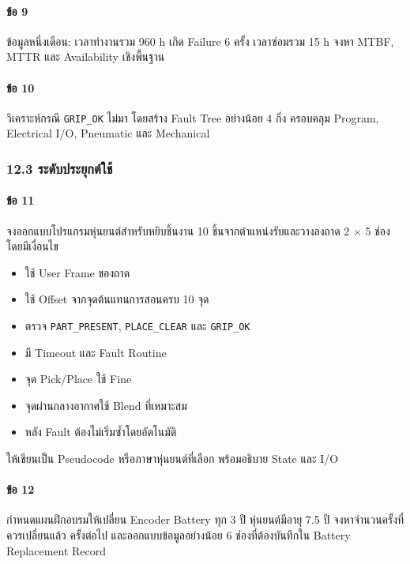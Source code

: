 \paragraph{ข้อ 9}

ข้อมูลหนึ่งเดือน: เวลาทำงานรวม 960 h เกิด Failure 6 ครั้ง เวลาซ่อมรวม 15 h จงหา MTBF, MTTR และ Availability เชิงพื้นฐาน

\paragraph{ข้อ 10}

วิเคราะห์กรณี \texttt{GRIP\_OK} ไม่มา โดยสร้าง Fault Tree อย่างน้อย 4 กิ่ง ครอบคลุม Program, Electrical I/O, Pneumatic และ Mechanical

\subsubsection{12.3 ระดับประยุกต์ใช้}

\paragraph{ข้อ 11}

จงออกแบบโปรแกรมหุ่นยนต์สำหรับหยิบชิ้นงาน 10 ชิ้นจากตำแหน่งรับและวางลงถาด 2 × 5 ช่อง โดยมีเงื่อนไข

\begin{itemize}
    \item ใช้ User Frame ของถาด
    \item ใช้ Offset จากจุดต้นแทนการสอนครบ 10 จุด
    \item ตรวจ \texttt{PART\_PRESENT}, \texttt{PLACE\_CLEAR} และ \texttt{GRIP\_OK}
    \item มี Timeout และ Fault Routine
    \item จุด Pick/Place ใช้ Fine
    \item จุดผ่านกลางอากาศใช้ Blend ที่เหมาะสม
    \item หลัง Fault ต้องไม่เริ่มซ้ำโดยอัตโนมัติ
\end{itemize}

ให้เขียนเป็น Pseudocode หรือภาษาหุ่นยนต์ที่เลือก พร้อมอธิบาย State และ I/O

\paragraph{ข้อ 12}

กำหนดแผนฝึกอบรมให้เปลี่ยน Encoder Battery ทุก 3 ปี หุ่นยนต์มีอายุ 7.5 ปี จงหาจำนวนครั้งที่ควรเปลี่ยนแล้ว ครั้งต่อไป และออกแบบข้อมูลอย่างน้อย 6 ช่องที่ต้องบันทึกใน Battery Replacement Record

